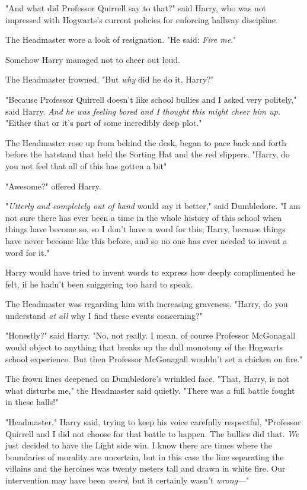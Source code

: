 "And what did Professor Quirrell say to that?" said Harry, who was not
impressed with Hogwarts's current policies for enforcing hallway discipline.

The Headmaster wore a look of resignation. "He said: \emph{Fire me}."

Somehow Harry managed not to cheer out loud.

The Headmaster frowned. "But \emph{why} did he do it, Harry?"

"Because Professor Quirrell doesn't like school bullies and I asked very
politely," said Harry. \emph{And he was feeling bored and I thought this might
cheer him up.} "Either that or it's part of some incredibly deep plot."

The Headmaster rose up from behind the desk, began to pace back and forth
before the hatstand that held the Sorting Hat and the red slippers. "Harry, do
you not feel that all of this has gotten a bit{\el}"

"Awesome?" offered Harry.

"\emph{Utterly and completely out of hand} would say it better," said
Dumbledore. "I am not sure there has ever been a time in the whole history of
this school when things have become so, so{\el} I don't have a word for
this, Harry, because things have never become like this before, and so no one
has ever needed to invent a word for it."

Harry would have tried to invent words to express how deeply complimented he
felt, if he hadn't been sniggering too hard to speak.

The Headmaster was regarding him with increasing graveness. "Harry, do you
understand \emph{at all} why I find these events concerning?"

"Honestly?" said Harry. "No, not really. I mean, of course Professor McGonagall
would object to anything that breaks up the dull monotony of the Hogwarts
school experience. But then Professor McGonagall wouldn't set a chicken on
fire."

The frown lines deepened on Dumbledore's wrinkled face. "That, Harry, is not
what disturbs me," the Headmaster said quietly. "There was a full battle fought
in these halls!"

"Headmaster," Harry said, trying to keep his voice carefully respectful,
"Professor Quirrell and I did not choose for that battle to happen. The bullies
did that. \emph{We} just decided to have the Light side win. I know there are
times where the boundaries of morality are uncertain, but in this case the line
separating the villains and the heroines was twenty meters tall and drawn in
white fire. Our intervention may have been \emph{weird}, but it certainly
wasn't \emph{wrong}\mbox{---}"

